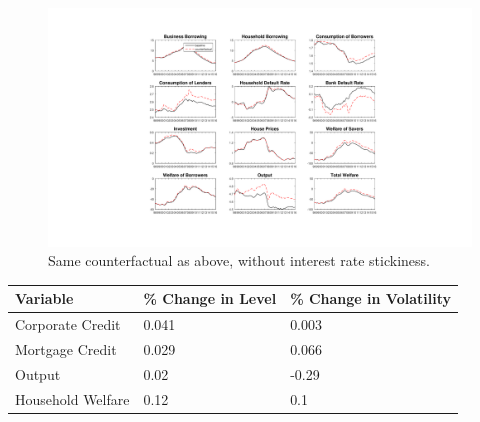 \documentclass[12pt]{article}
\numberwithin{equation}{section}
\begin{document}
\begin{figure}[H]
\centering
\caption{Same counterfactual as above, without interest rate stickiness.}
\label{counterfact3_figure}
\includegraphics[scale=0.45]{counterfactuals11.pdf}
\end{figure}



\begin{table}[h]
\label{counterfact3_table}
\begin{tabular}{l|l|l}
\small
Variable & \% Change in Level & \% Change in Volatility \\
\hline
\hline
    Corporate Credit           &       0.041    &     0.003 \\
    Mortgage Credit            &      0.029    &      0.066 \\
    Output         				&     0.02    &    -0.29 \\ 
    Household Welfare       &     0.12     &     0.1\\
\end{tabular}
\end{table}
\end{document}
